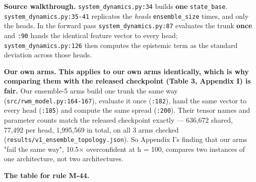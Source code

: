 \documentclass[10pt]{article}
\begin{document}
\textbf{Source walkthrough.} \texttt{system\_dynamics.py:34} builds \textbf{one} \texttt{state\_base}. \texttt{system\_dynamics.py:35-41} replicates the \emph{heads} \texttt{ensemble\_size} times, and only the heads. In the forward pass \texttt{system\_dynamics.py:87} evaluates the trunk \textbf{once} and \texttt{:90} hands the identical feature vector to every head; \texttt{system\_dynamics.py:126} then computes the epistemic term as the standard deviation across those heads.

\textbf{Our own arms.} \textbf{This applies to our own arms identically, which is why comparing them with the released checkpoint (Table 3, Appendix I) is fair.} Our ensemble-5 arms build one trunk the same way (\texttt{src/\allowbreak{}rwm\_\allowbreak{}model\allowbreak{}.py:164-167}), evaluate it once (\texttt{:182}), hand the same vector to every head (\texttt{:185}) and compute the same spread (\texttt{:200}). Their tensor names and parameter counts match the released checkpoint exactly --- 636,672 shared, 77,492 per head, 1,995,569 in total, on all 3 arms checked (\texttt{results/\allowbreak{}v1\_\allowbreak{}ensemble\_\allowbreak{}topology\allowbreak{}.json}). So Appendix I's finding that our arms "fail the same way", 10.5$\times$ overconfident at h = 100, compares two instances of one architecture, not two architectures.

\textbf{The table for rule M-44.}

\begin{center}\small{}\end{center}
\end{document}

